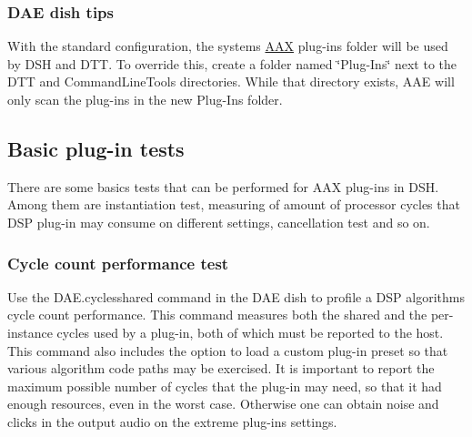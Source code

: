 \hypertarget{a00365_subsection__dsh_tips}{}\subsubsection{D\+A\+E dish tips}\label{a00365_subsection__dsh_tips}
 
\begin{DoxyItemize}
\item With the standard configuration, the system\textquotesingle{}s \hyperlink{a00288}{A\+A\+X} plug-\/ins folder will be used by D\+S\+H and D\+T\+T. To override this, create a folder named \char`\"{}\+Plug-\/\+Ins\char`\"{} next to the D\+T\+T and Command\+Line\+Tools directories. While that directory exists, A\+A\+E will only scan the plug-\/ins in the new Plug-\/\+Ins folder.  
\end{DoxyItemize}



 \hypertarget{a00365_dsh_guide_02_basic_plugin_tests}{}\subsection{Basic plug-\/in tests}\label{a00365_dsh_guide_02_basic_plugin_tests}
 There are some basics tests that can be performed for A\+A\+X plug-\/ins in D\+S\+H. Among them are instantiation test, measuring of amount of processor cycles that D\+S\+P plug-\/in may consume on different settings, cancellation test and so on.

\hypertarget{a00365_subsection__cyclessharedtest}{}\subsubsection{Cycle count performance test}\label{a00365_subsection__cyclessharedtest}
 Use the D\+A\+E.\+cyclesshared command in the D\+A\+E dish to profile a D\+S\+P algorithm\textquotesingle{}s cycle count performance. This command measures both the shared and the per-\/instance cycles used by a plug-\/in, both of which must be reported to the host. This command also includes the option to load a custom plug-\/in preset so that various algorithm code paths may be exercised. It is important to report the maximum possible number of cycles that the plug-\/in may need, so that it had enough resources, even in the worst case. Otherwise one can obtain noise and clicks in the output audio on the extreme plug-\/in\textquotesingle{}s settings.


